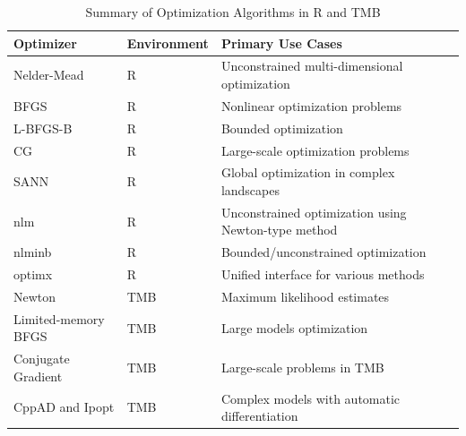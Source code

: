 \documentclass[12pt, twoside,hidelinks]{article}
\theoremstyle{definition}
\numberwithin{equation}{section}
\begin{document}
\begin{table}[ht]
\centering
\begin{tabular}{lll}
\toprule
\textbf{Optimizer} & \textbf{Environment} & \textbf{Primary Use Cases} \\
\midrule
Nelder-Mead & R & Unconstrained multi-dimensional optimization \\
BFGS & R & Nonlinear optimization problems \\
L-BFGS-B & R & Bounded optimization \\
CG & R & Large-scale optimization problems \\
SANN & R & Global optimization in complex landscapes \\
nlm & R & Unconstrained optimization using Newton-type method \\
nlminb & R & Bounded/unconstrained optimization \\
optimx & R & Unified interface for various methods \\
Newton & TMB & Maximum likelihood estimates \\
Limited-memory BFGS & TMB & Large models optimization \\
Conjugate Gradient & TMB & Large-scale problems in TMB \\
CppAD and Ipopt & TMB & Complex models with automatic differentiation \\
\bottomrule
\end{tabular}
\caption{Summary of Optimization Algorithms in R and TMB}
\label{tab:optimizers}
\end{table}
\end{document}
